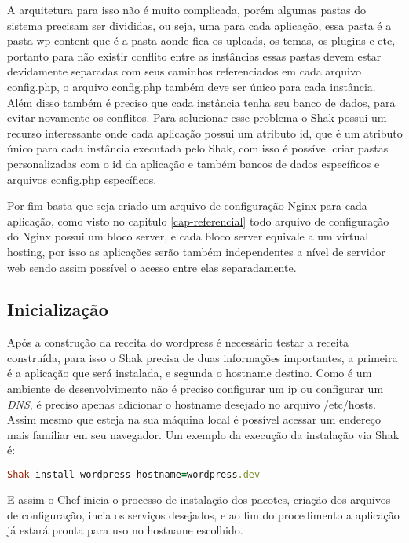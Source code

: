 A arquitetura para isso não é muito complicada, porém algumas pastas do sistema
precisam ser divididas, ou seja, uma para cada aplicação, essa pasta é a pasta wp-content
que é a pasta aonde fica os uploads, os temas, os plugins e etc, portanto para não
existir conflito entre as instâncias essas pastas devem estar devidamente separadas
com seus caminhos referenciados em cada arquivo config.php, o arquivo config.php também
deve ser único para cada instância. Além disso também é preciso que cada instância
tenha seu banco de dados, para evitar novamente os conflitos. Para
solucionar esse problema o Shak possui um recurso interessante onde cada aplicação
possui um atributo id, que é um atributo único para cada instância executada pelo
Shak, com isso é possível criar pastas personalizadas com o id da aplicação e também
bancos de dados específicos e arquivos config.php específicos.

Por fim basta que seja criado um arquivo de configuração Nginx para cada aplicação,
como visto no capitulo \ref{cap-referencial} todo arquivo de configuração
do Nginx possui um bloco server, e cada bloco server equivale a um virtual hosting,
por isso as aplicações serão também independentes a nível de servidor web sendo assim
possível o acesso entre elas separadamente.

\subsection{Inicialização}

Após a construção da receita do wordpress é necessário testar a receita construída,
para isso o Shak precisa de duas informações importantes, a primeira é a aplicação
que será instalada, e segunda o hostname destino. Como é um ambiente de desenvolvimento
não é preciso configurar um ip ou configurar um \textit{DNS}, é preciso apenas adicionar o
hostname desejado no arquivo /etc/hosts. Assim mesmo que esteja na sua máquina local
é possível acessar um endereço mais familiar em seu navegador. Um exemplo da execução
da instalação via Shak é:

\begin{lstlisting}[language=Ruby,label=dice_index,caption={Exemplo de exexução de instalação do wordpress com shak}]
Shak install wordpress hostname=wordpress.dev
\end{lstlisting}

E assim o Chef inicia o processo de instalação dos pacotes, criação dos arquivos
de configuração, incia os serviços desejados, e ao fim do procedimento a aplicação
já estará pronta para uso no hostname escolhido.


